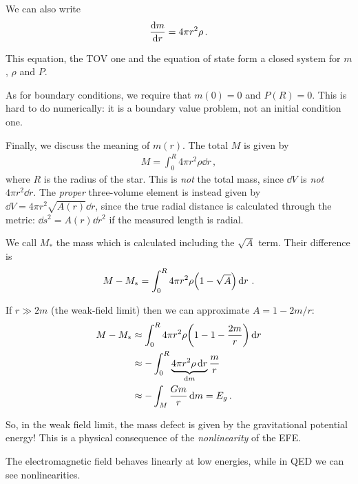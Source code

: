 \documentclass[main.tex]{subfiles}
\begin{document}
We can also write 
%
\begin{align}
\dv{m}{r} = 4 \pi r^2 \rho 
\,.
\end{align}

This equation, the TOV one and the equation of state form a closed system for \(m\), \(\rho \) and \(P\). 

As for boundary conditions, we require that \(m(0) = 0\) and \(P(R) = 0\). 
This is hard to do numerically: it is a boundary value problem, not an initial condition one. 

Finally, we discuss the meaning of \(m(r)\). 
The total \(M\) is given by 
%
\begin{align}
M = \int_{0}^{R} 4 \pi r^2 \rho \dd{r}
\,,
\end{align}
%
where \(R\) is the radius of the star. This is \emph{not} the total mass, since \(\dd{V}\) is \emph{not} \(4 \pi r^2 \dd{r}\). 
The \emph{proper} three-volume element is instead given by \(\dd{V} = 4 \pi r^2 \sqrt{A(r)} \dd{r}\), since the true radial distance is calculated through the metric: \(\dd{s^2} = A(r) \dd{r^2}\) if the measured length is radial. 

We call \(M_*\) the mass which is calculated including the \(\sqrt{A}\) term. Their difference is 
%
\begin{align}
M - M_* = \int_{0}^{R} 4 \pi r^2 \rho \qty(1 - \sqrt{A}) \dd{r}
\,.
\end{align}
 
If \(r \gg 2m\) (the weak-field limit) then we can approximate \(A = 1 - 2m /r\):
%
\begin{align}
M - M_* &\approx \int_{0}^{R} 4 \pi r^2 \rho \qty(1 - 1 - \frac{2m}{r}) \dd{r}    \\
&\approx - \int_{0}^{R} \underbrace{4 \pi r^2 \rho \dd{r}}_{ \dd{m}} \frac{m}{r}   \\
&\approx - \int_{M} \frac{Gm}{r} \dd{m} = E_g
\,.
\end{align}

So, in the weak field limit, the mass defect is given by the gravitational potential energy! 
This is a physical consequence of the \emph{nonlinearity} of the EFE. 

The electromagnetic field behaves linearly at low energies, while in QED we can see nonlinearities.
\end{document}
